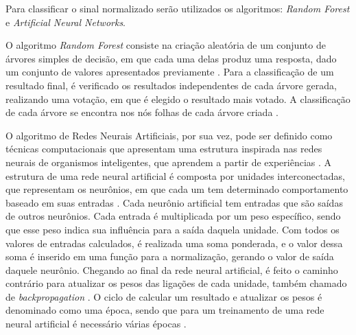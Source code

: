 \documentclass[conference]{IEEEtran}
\begin{document}
 
Para classificar o sinal normalizado serão utilizados os algoritmos: \textit{Random Forest} e \textit{Artificial Neural Networks}.

O algoritmo \textit{Random Forest} consiste na criação aleatória de um conjunto de árvores simples de decisão, em que cada uma delas produz uma resposta, dado um conjunto de valores apresentados previamente \cite{statsoft09}. Para a classificação de um resultado final, é verificado os resultados independentes de cada árvore gerada, realizando uma votação, em que é elegido o resultado mais votado. A classificação de cada árvore se encontra nos nós folhas de cada árvore criada \cite{dantas2015}.

O algoritmo de Redes Neurais Artificiais, por sua vez, pode ser definido como técnicas computacionais que apresentam uma estrutura inspirada nas redes neurais de organismos inteligentes, que aprendem a partir de experiências \cite{carvalho09}. A estrutura de uma rede neural artificial é composta por unidades interconectadas, que representam os neurônios, em que cada um tem determinado comportamento baseado em suas entradas \cite{zuben03}. Cada neurônio artificial tem entradas que são saídas de outros neurônios. Cada entrada é multiplicada por um peso específico, sendo que esse peso indica sua influência para a saída daquela unidade. Com todos os valores de entradas calculados, é realizada uma soma ponderada, e o valor dessa soma é inserido em uma função para a normalização, gerando o valor de saída daquele neurônio. Chegando ao final da rede neural artificial, é feito o caminho contrário para atualizar os pesos das ligações de cada unidade, também chamado de \textit{backpropagation} \cite{zuben03}. O ciclo de calcular um resultado e atualizar os pesos é denominado como uma época, sendo que para  um treinamento de uma rede neural artificial é necessário várias épocas \cite{carvalho09}.

%
%
\end{document}
